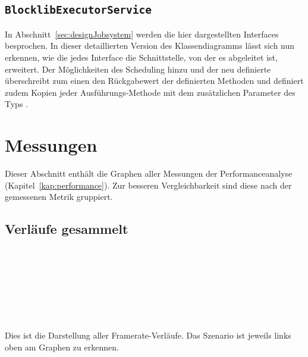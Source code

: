 \clearpage
\subsection{\texttt{BlocklibExecutorService}}\label{appendix:BlocklibExecutorService}
{
	\centering
	
	\par
}
In Abschnitt~\vref{sec:designJobsystem} werden die hier dargestellten Interfaces besprochen. In dieser detaillierten Version des Klassendiagramms lässt sich nun erkennen, wie die jedes Interface die Schnittstelle, von der es abgeleitet ist, erweitert. Der \classScheduledExecutorService{} Möglichkeiten des Scheduling hinzu und der neu definierte \classBlocklibExecutorService{} überschreibt zum einen den Rückgabewert der definierten Methoden und definiert zudem Kopien jeder Ausführungs-Methode mit dem zusätzlichen Parameter  des Typs \classTaskPriority{}.

\clearpage
\section{Messungen}\label{appendix:plots}
\small
Dieser Abschnitt enthält die Graphen aller Messungen der Performanceanalyse (Kapitel~\ref{kap:performance}). Zur besseren Vergleichbarkeit sind diese nach der gemessenen Metrik gruppiert.
\vspace*{-.3em}\subsection{ Verläufe gesammelt}\label{appendix:fpsplots}
\settowidth{}
\\[-.3em]
\\[-.3em]
\\[-.3em]
\\[-.3em]
\\[-.3em]
\\[-.3em]\\[-.3em]
Dies ist die Darstellung aller Framerate-Verläufe. Das Szenario ist jeweils links oben am Graphen zu erkennen.


